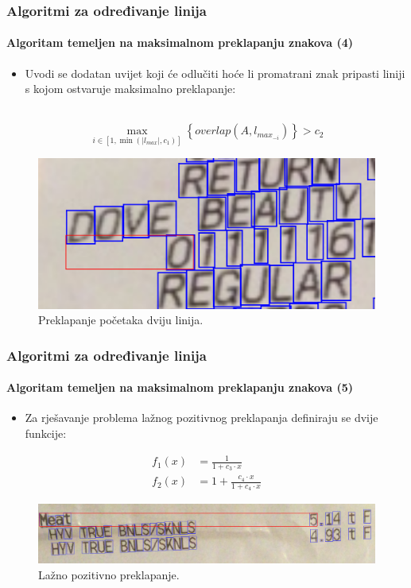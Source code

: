 \documentclass{beamer}
\begin{document}
\begin{frame}
\frametitle{Algoritmi za određivanje linija}
\framesubtitle{Algoritam temeljen na maksimalnom preklapanju znakova (4)}
\begin{itemize}
    \item Uvodi se dodatan uvijet koji će odlučiti hoće
    li promatrani znak pripasti liniji s kojom ostvaruje maksimalno preklapanje:
\end{itemize}
\
\begin{equation}
\label{eq:overlap-03}
\max_{i \in [1, \min(|l_{max}|, c_1)]}\left\{\textit{overlap}(A, l_{max_{-i}})
\right\} > c_2
\end{equation}
\begin{figure}[htb]
    \centering
    \includegraphics[width=.7\textwidth]{images/overlap-01.png}
    \caption{Preklapanje početaka dviju linija.}
    \label{fig:overlap-01}
\end{figure}
\end{frame}
\begin{frame}
\frametitle{Algoritmi za određivanje linija}
\framesubtitle{Algoritam temeljen na maksimalnom preklapanju znakova (5)}
\begin{itemize}
    \item Za rješavanje problema lažnog pozitivnog preklapanja definiraju se dvije
          funkcije:
\end{itemize}
\begin{align}
    f_1(x) &= \frac{1}{1 + c_3 \cdot x} \\[10pt]
    f_2(x) &= 1 + \frac{c_4 \cdot x}{1 + c_4 \cdot x}
\end{align}
\begin{figure}[htb]
    \centering
    \includegraphics[width=\textwidth]{images/overlap-02.png}
    \caption{Lažno pozitivno preklapanje.}
    \label{fig:overlap-02}
\end{figure}
\end{frame}
\end{document}

